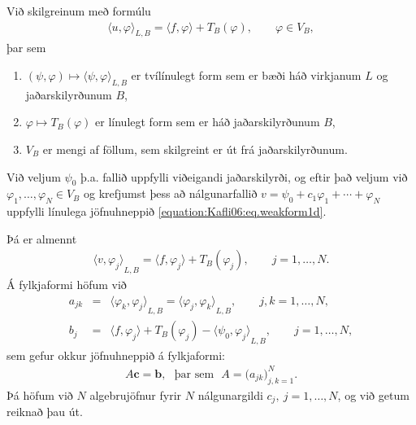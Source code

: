 \documentclass[a4paper,10pt,icelandic]{sphinxmanual}
\begin{document}
Við skilgreinum  með formúlu
\begin{equation}\label{equation:Kafli06:eq.weakform1d}
\begin{split}{{\langle u,\varphi\rangle}}_{L,B}={{\langle f,\varphi\rangle}}+T_B(\varphi), \qquad
\varphi\in V_B,\end{split}
\end{equation}
þar sem
\begin{enumerate}
\def\theenumi{\arabic{enumi}}
\def\labelenumi{\theenumi .}
\makeatletter\def\p@enumii{\p@enumi \theenumi .}\makeatother
\item {} 
\((\psi,\varphi)\mapsto {{\langle \psi,\varphi\rangle}}_{L,B}\) er tvílínulegt form sem er bæði háð virkjanum \(L\) og jaðarskilyrðunum \(B\),

\item {} 
\(\varphi\mapsto T_B(\varphi)\) er línulegt form sem er háð jaðarskilyrðunum \(B\),

\item {} 
\(V_B\) er mengi af föllum, sem skilgreint er út frá jaðarskilyrðunum.

\end{enumerate}

Við veljum \(\psi_0\) þ.a. fallið uppfylli viðeigandi jaðarskilyrði, og eftir það veljum við \(\varphi_1,\dots,\varphi_N\in V_B\) og krefjumst þess að nálgunarfallið \(v=\psi_0+c_1\varphi_1+\cdots+\varphi_N\) uppfylli línulega jöfnuhneppið \eqref{equation:Kafli06:eq.weakform1d}.

Þá er almennt
\begin{equation*}
\begin{split}{{\langle v,\varphi_j\rangle}}_{L,B}={{\langle f,\varphi_j\rangle}}+T_B(\varphi_j),
\qquad j=1,\dots,N.\end{split}
\end{equation*}
Á fylkjaformi höfum við
\begin{equation*}
\begin{split}a_{jk} &=&{{\langle \varphi_k,\varphi_j\rangle}}_{L,B}
={{\langle \varphi_j,\varphi_k\rangle}}_{L,B}, \qquad j,k=1,\dots,N,\\
b_j &=& {{\langle f,\varphi_j\rangle}}+T_B(\varphi_j)-{{\langle \psi_0,\varphi_j\rangle}}_{L,B},
\qquad j=1,\dots,N,\end{split}
\end{equation*}
sem gefur okkur jöfnuhneppið á fylkjaformi:
\begin{equation*}
\begin{split}A{\mathbf c}={\mathbf b}, ~~~\text{þar sem}~~~ A=\big(a_{jk}\big)_{j,k=1}^N.\end{split}
\end{equation*}
Þá höfum við \(N\) algebrujöfnur fyrir \(N\) nálgunargildi \(c_j, ~j=1, \dots, N\), og við getum reiknað þau út.
\end{document}
